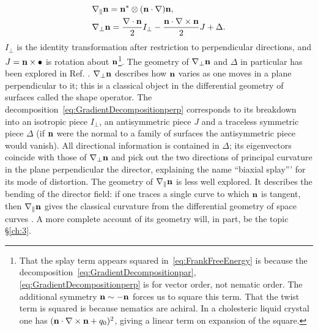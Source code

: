 \begin{align}
    &\nabla_\parallel {\bf n}=  {\bf n}^* \otimes ({\bf n} \cdot \nabla) {\bf n}\label{eq:GradientDecompositionpar}, \\
    &\nabla_\perp {\bf n}= \frac{\nabla \cdot {\bf n}}{2}I_\perp - \frac{{\bf n} \cdot \nabla \times {\bf n}}{2} J + \Delta .
    \label{eq:GradientDecompositionperp}
\end{align}
$I_\perp$ is the identity transformation after restriction to perpendicular directions, and $J= \bf n \times \bullet$ is rotation about $\bf n$\footnote{That the splay term appears squared in~\eqref{eq:FrankFreeEnergy} is because the decomposition~\eqref{eq:GradientDecompositionpar},\eqref{eq:GradientDecompositionperp} is for vector order, not nematic order. The additional symmetry $\bf n \sim -n$ forces us to square this term. That the twist term is squared is because nematics are achiral. In a cholesteric liquid crystal \citep{Bellar2014} one has $({\bf n} \cdot \nabla \times {\bf n}+q_0)^2$, giving a linear term on expansion of the square.}. The geometry of $\nabla_\perp \bf n$ and $\Delta$ in particular has been explored in Ref. \citep{Machon2016b}. $\nabla_\perp \bf n$ describes how $\bf n$ varies as one moves in a plane perpendicular to it; this is a classical object in the differential geometry of surfaces called the shape operator. The decomposition~\eqref{eq:GradientDecompositionperp} corresponds to its breakdown into an isotropic piece $I_\perp$, an antisymmetric piece $J$ and a traceless symmetric piece $\Delta$ (if $\bf n$ were the normal to a family of surfaces the antisymmetric piece would vanish). All directional information is contained in $\Delta$; its eigenvectors coincide with those of $\nabla_\perp \bf n$ and pick out the two directions of principal curvature in the plane perpendicular the director, explaining the name ``biaxial splay''' for its mode of distortion. The geometry of $\nabla_\parallel \bf n$ is less well explored. It describes the bending of the director field: if one traces a single curve to which $\bf n$ is tangent, then $\nabla_\parallel \bf n $ gives the classical curvature from the differential geometry of space curves \citep{DoCarmoBook}. A more complete account of its geometry will, in part, be the topic \S\ref{ch:3}.
 
